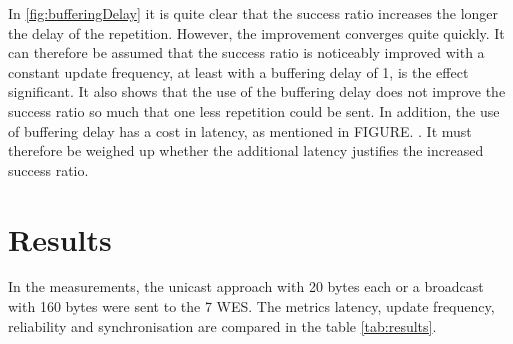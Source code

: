 In \cref{fig:bufferingDelay} it is quite clear that the success ratio increases the longer the delay of the repetition.
However, the improvement converges quite quickly.
It can therefore be assumed that the success ratio is noticeably improved with a constant update frequency, 
at least with a buffering delay of 1, is the effect significant. 
It also shows that the use of the buffering delay does not improve the success ratio so much 
that one less repetition could be sent.
In addition, the use of buffering delay has a cost in latency, as mentioned in FIGURE. .
It must therefore be weighed up whether the additional latency justifies the increased success ratio.





\section{Results}

In the measurements, the unicast approach with 20 bytes each or a broadcast with 160 bytes were sent to the 7 WES.
The metrics latency, update frequency, reliability and synchronisation are compared in the table \cref{tab:results}.

